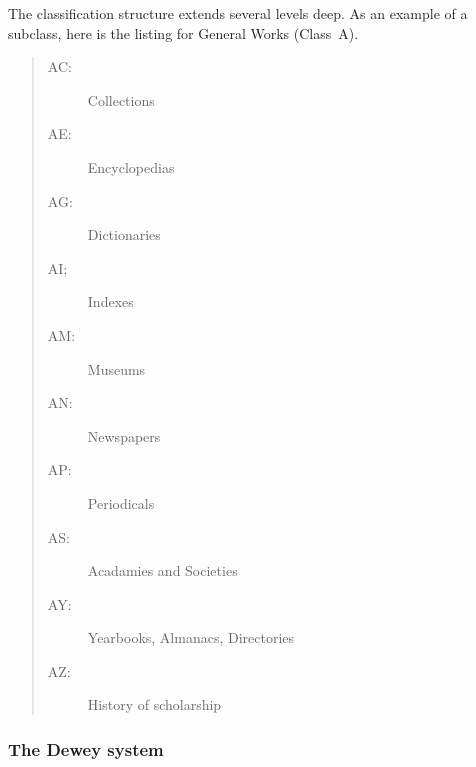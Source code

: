 \documentclass{article}
\begin{document}
    The classification structure extends several levels deep. 
As an example of a 
subclass, here is the listing for General Works (Class~A).
\begin{quote}
\begin{description}
\item[AC:] Collections
\item[AE:] Encyclopedias
\item[AG:] Dictionaries
\item[AI;] Indexes
\item[AM:] Museums
\item[AN:] Newspapers
\item[AP:] Periodicals
\item[AS:] Acadamies and Societies
\item[AY:] Yearbooks, Almanacs, Directories
\item[AZ:] History of scholarship
\end{description}
\end{quote}

\subsubsection{The Dewey system}
\end{document}
